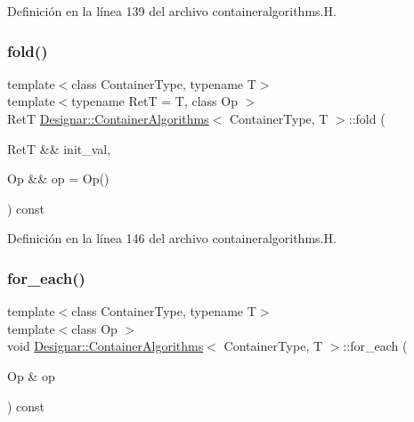 Definición en la línea 139 del archivo containeralgorithms.\+H.

\mbox{\label{class_designar_1_1_container_algorithms_a9ff56a438586390aaf72aa2fda0f86e7}} 
\subsubsection{\texorpdfstring{fold()}{fold()}\hspace{0.1cm}{\footnotesize\ttfamily [4/4]}}
{\footnotesize\ttfamily template$<$class Container\+Type, typename T$>$ \\
template$<$typename RetT  = T, class Op $>$ \\
RetT \hyperlink{class_designar_1_1_container_algorithms}{Designar\+::\+Container\+Algorithms}$<$ Container\+Type, T $>$\+::fold (\begin{DoxyParamCaption}\item[{RetT \&\&}]{init\+\_\+val,  }\item[{Op \&\&}]{op = {\ttfamily Op()} }\end{DoxyParamCaption}) const\hspace{0.3cm}{\ttfamily [inline]}}



Definición en la línea 146 del archivo containeralgorithms.\+H.

\mbox{\label{class_designar_1_1_container_algorithms_a32b1ccc6fc97faf17064b55e9224ba32}} 
\subsubsection{\texorpdfstring{for\+\_\+each()}{for\_each()}\hspace{0.1cm}{\footnotesize\ttfamily [1/2]}}
{\footnotesize\ttfamily template$<$class Container\+Type, typename T$>$ \\
template$<$class Op $>$ \\
void \hyperlink{class_designar_1_1_container_algorithms}{Designar\+::\+Container\+Algorithms}$<$ Container\+Type, T $>$\+::for\+\_\+each (\begin{DoxyParamCaption}\item[{Op \&}]{op }\end{DoxyParamCaption}) const\hspace{0.3cm}{\ttfamily [inline]}}



